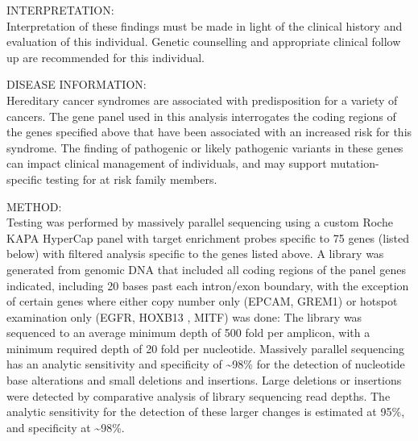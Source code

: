\documentclass[10pt]{article}
\newcommand{\data}[1]{}
\newenvironment{dataiter}[1]{}{}
\begin{document}
\begin{dataiter}{variants}
  \data{mega_hgvs}\newline
\end{dataiter}

INTERPRETATION: \\
\data{plugin:long_blurb}

Interpretation of these findings must be made in light of the clinical history and evaluation of this individual. Genetic counselling and appropriate clinical follow up are recommended for this individual.

DISEASE INFORMATION: \\
Hereditary cancer syndromes are associated with predisposition for a variety of cancers. The gene panel used in this analysis interrogates the coding regions of the genes specified above that have been associated with an increased risk for this syndrome. The finding of pathogenic or likely pathogenic variants in these genes can impact clinical management of individuals, and may support mutation-specific testing for at risk family members.

METHOD: \\
Testing was performed by massively parallel sequencing using a custom Roche KAPA HyperCap panel with target enrichment probes specific to 75 genes (listed below) with filtered analysis specific to the genes listed above. A library was generated from genomic DNA that included all coding regions of the panel genes indicated, including 20 bases past each intron/exon boundary, with the exception of certain genes where either copy number only (EPCAM, GREM1) or hotspot examination only (EGFR, HOXB13 , MITF) was done: The library was sequenced to an average minimum depth of 500 fold per amplicon, with a minimum required depth of 20 fold per nucleotide. Massively parallel sequencing has an analytic sensitivity and specificity of \textasciitilde 98\% for the detection of nucleotide base alterations and small deletions and insertions. Large deletions or insertions were detected by comparative analysis of library sequencing read depths. The analytic sensitivity for the detection of these larger changes is estimated at 95\%, and specificity at \textasciitilde 98\%.
\end{document}
